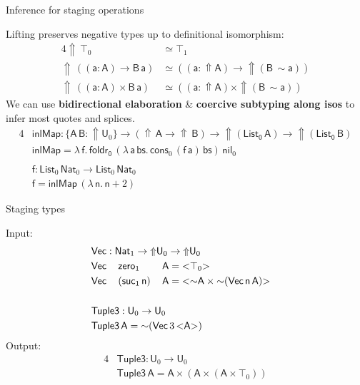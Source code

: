 \documentclass[dvipsnames,aspectratio=169]{beamer}
\newcommand{\msf}[1]{\mathsf{#1}}
\newcommand{\Lift}{{\Uparrow}}
\newcommand{\spl}{{\sim}}
\newcommand{\qut}[1]{{<}#1{>}}
\newcommand{\U}{\msf{U}}
\newcommand{\List}{\msf{List}}
\newcommand{\nil}{\msf{nil}}
\newcommand{\cons}{\msf{cons}}
\newcommand{\Nat}{\msf{Nat}}
\newcommand{\zero}{\msf{zero}}
\newcommand{\suc}{\msf{suc}}
\theoremstyle{remark}
\newcommand{\Vect}{\msf{Vec}}
\newcommand{\msA}{\msf{A}}
\newcommand{\msB}{\msf{B}}
\newcommand{\msbs}{\msf{bs}}
\newcommand{\msff}{\msf{f}}
\newcommand{\msa}{\msf{a}}
\newcommand{\msn}{\msf{n}}
\begin{document}
\begin{frame}{Inference for staging operations}

Lifting preserves negative types up to definitional isomorphism:
\begin{alignat*}{4}
  \Lift\,\top_0 &\simeq \top_1 \\
  \Lift\,((\msa : \msA) \to \msB\,\msa) &\simeq ((\msa : \Lift\msA) \to \Lift(\msB\,\spl\msa)) \\
  \Lift\,((\msa : \msA) \times \msB\,\msa) &\simeq ((\msa : \Lift\msA) \times \Lift(\msB\,\spl\msa))
\end{alignat*}
\pause
We can use \textbf{bidirectional elaboration} \& \textbf{coercive subtyping along isos} to
infer most quotes and splices.
\begin{alignat*}{4}
  & \msf{inlMap} : \{\msA\,\msB : \Lift \U_0\} \to (\Lift\,\msA \to \Lift\,\msB) \to \Lift(\msf{List_0}\,\msA) \to \Lift(\msf{List_0}\,\msB) \\
  & \msf{inlMap} = \lambda\,\msff.\,\msf{foldr_0}\,
    (\lambda\,\msa\,\msbs.\,\cons_0\,(\msff\,\msa)\,\msbs)\,
    \nil_0
    \\
  & \\
  & \msf{f} : \List_0\,\Nat_0 \to \List_0\,\Nat_0\\
  & \msf{f} = \msf{inlMap}\,(\lambda\,\msf{n}.\,\msf{n} + 2)
\end{alignat*}



\end{frame}

\begin{frame}{Staging types}

Input:
\begin{alignat*}{4}
  & \rlap{$\Vect : \Nat_1 \to \Lift \U_0 \to \Lift \U_0$}\\
  & \Vect\,&&\zero_1       \,&&\msA = \qut{\top_0}\\
  & \Vect\,&&(\suc_1\,\msn)\,&&\msA = \qut{\spl \msA \times \spl(\Vect\,\msn\,\msA)}\\
  & \\
  & \rlap{$\msf{Tuple3} : \U_0 \to \U_0$} \\
  & \rlap{$\msf{Tuple3}\,\msA = \spl(\Vect\,3\,\qut{\msA})$}
\end{alignat*}
\pause
Output:
\begin{alignat*}{4}
  &\msf{Tuple3} : \U_0 \to \U_0 \\
  &\msf{Tuple3}\,\msA = \msA \times (\msA \times (\msA \times \top_0))
\end{alignat*}

\end{frame}
\end{document}
